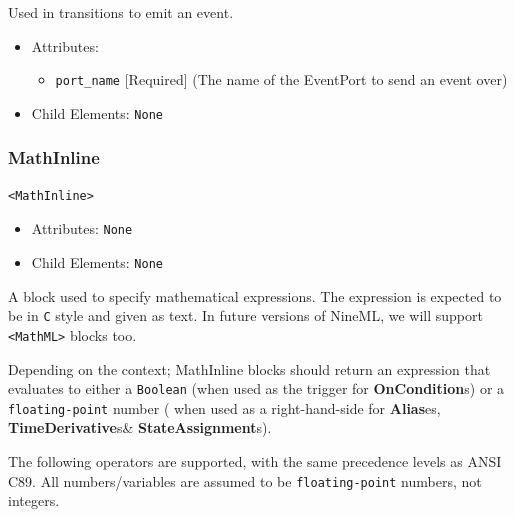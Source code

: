\documentclass{article}
\newcommand{\StateAssignments}{{\bf{StateAssignment}}s\xspace}
\newcommand{\TimeDerivatives}{{\bf{TimeDerivative}}s\xspace}
\newcommand{\Aliases}{{\bf{Alias}}es\xspace}
\newcommand{\OnConditions}{{\bf{OnCondition}}s\xspace}
\begin{document}
Used in transitions to emit an event.

\begin{itemize}
\item Attributes:
%
\begin{itemize}
\item \verb|port_name| {[}Required{]} (The name of the EventPort to send an
event over)
\end{itemize}

\item Child Elements: \texttt{None}
\end{itemize}

\subsubsection{MathInline}
%
\begin{lstlisting}
<MathInline>
\end{lstlisting}
\begin{itemize}
\item Attributes:  \texttt{None}

\item Child Elements: \texttt{None}
\end{itemize}

A block used to specify mathematical expressions. The expression is expected to
be in \texttt{C} style and given as text. In future versions of NineML, we will
support \verb|<MathML>| blocks too.

Depending on the context; MathInline blocks should return an expression that
evaluates to either a \verb|Boolean| (when used as the trigger for
\OnConditions) or a \verb|floating-point| number ( when used  as a
right-hand-side for  \Aliases, \TimeDerivatives \& \StateAssignments).

The following operators are supported, with the same precedence levels as ANSI
C89. All
numbers/variables are assumed to be \verb|floating-point| numbers, not integers.
\end{document}
